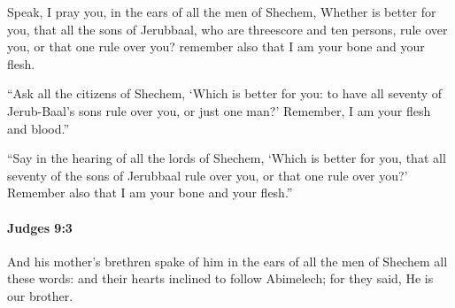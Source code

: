 			\begin{versebox}
					\item[BHS] 
					\item[ASV] Speak, I pray you, in the ears of all the men of Shechem, Whether is better for you, that all the sons of Jerubbaal, who are threescore and ten persons, rule over you, or that one rule over you? remember also that I am your bone and your flesh.
					\item[NIV] “Ask all the citizens of Shechem, ‘Which is better for you: to have all seventy of Jerub-Baal’s sons rule over you, or just one man?’ Remember, I am your flesh and blood.”
					\item[NRSV] “Say in the hearing of all the lords of Shechem, ‘Which is better for you, that all seventy of the sons of Jerubbaal rule over you, or that one rule over you?’ Remember also that I am your bone and your flesh.”
			\end{versebox}

		\paragraph{Judges 9:3} %
			\label{JUDGES-9-3}

			And his mother’s brethren spake of him in the ears of all the men of Shechem all these words: and their hearts inclined to follow Abimelech; for they said, He is our brother.


